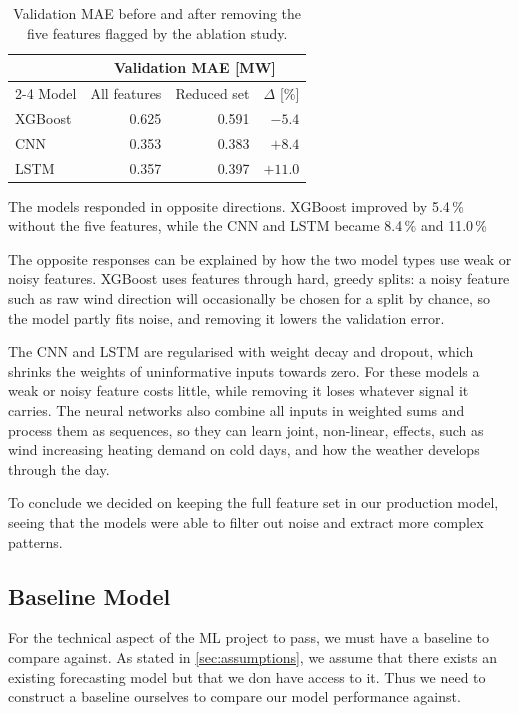 \documentclass[11pt,a4paper]{article}
\begin{document}
\begin{table}[H]
\centering
\caption{Validation MAE before and after removing the five features flagged by the ablation study.}
\label{tab:ablation-before-after}
\small
\begin{tabular}{lrrr}
\toprule
 & \multicolumn{3}{c}{Validation MAE [MW]} \\
\cmidrule(lr){2-4}
Model & All features & Reduced set & $\Delta$ [\%] \\
\midrule
XGBoost & 0.625 & 0.591 & $-5.4$ \\
CNN     & 0.353 & 0.383 & $+8.4$ \\
LSTM    & 0.357 & 0.397 & $+11.0$ \\
\bottomrule
\end{tabular}
\end{table}

The models responded in opposite directions. XGBoost improved by 5.4\,\% without the five features, while the CNN and LSTM became 8.4\,\% and 11.0\,\%

The opposite responses can be explained by how the two model types use weak or noisy features. XGBoost uses features through hard, greedy splits: a noisy feature such as raw wind direction will occasionally be chosen for a split by chance, so the model partly fits noise, and removing it lowers the validation error. 

The CNN and LSTM are regularised with weight decay and dropout, which shrinks the weights of uninformative inputs towards zero. For these models a weak or noisy feature costs little, while removing it loses whatever signal it carries. The neural networks also combine all inputs in weighted sums and process them as sequences, so they can learn joint, non-linear, effects, such as wind increasing heating demand on cold days, and how the weather develops through the day. 

To conclude we decided on keeping the full feature set in our production model, seeing that the models were able to filter out noise and extract more complex patterns.


\subsection{Baseline Model}
For the technical aspect of the ML project to pass, we must have a baseline to compare against. As stated in \cref{sec:assumptions}, we assume that there exists an existing forecasting model but that we don have access to it. Thus we need to construct a baseline ourselves to compare our model performance against. 
\end{document}
